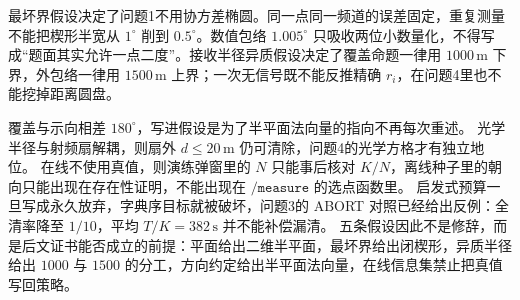 最坏界假设决定了问题1不用协方差椭圆。同一点同一频道的误差固定，重复测量不能把楔形半宽从 $1^\circ$ 削到 $0.5^\circ$。数值包络 $1.005^\circ$ 只吸收两位小数量化，不得写成“题面其实允许一点二度”。接收半径异质假设决定了覆盖命题一律用 $1000\,\mathrm{m}$ 下界，外包络一律用 $1500\,\mathrm{m}$ 上界；一次无信号既不能反推精确 $r_i$，在问题4里也不能挖掉距离圆盘。

覆盖与示向相差 $180^\circ$，写进假设是为了半平面法向量的指向不再每次重述。
光学半径与射频扇解耦，则扇外 $d\le 20\,\mathrm{m}$ 仍可清除，问题4的光学方格才有独立地位。
在线不使用真值，则演练弹窗里的 $N$ 只能事后核对 $K/N$，离线种子里的朝向只能出现在存在性证明，不能出现在 $\mathtt{/measure}$ 的选点函数里。
启发式预算一旦写成永久放弃，字典序目标就被破坏，问题3的 ABORT 对照已经给出反例：全清率降至 $1/10$，平均 $T/K=382\,\mathrm{s}$ 并不能补偿漏清。
五条假设因此不是修辞，而是后文证书能否成立的前提：平面给出二维半平面，最坏界给出闭楔形，异质半径给出 $1000$ 与 $1500$ 的分工，方向约定给出半平面法向量，在线信息集禁止把真值写回策略。

